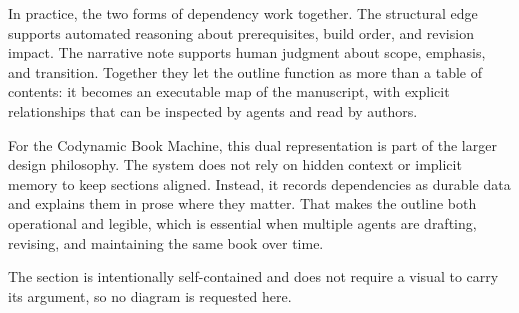 In practice, the two forms of dependency work together. The structural edge supports automated reasoning about prerequisites, build order, and revision impact. The narrative note supports human judgment about scope, emphasis, and transition. Together they let the outline function as more than a table of contents: it becomes an executable map of the manuscript, with explicit relationships that can be inspected by agents and read by authors.

For the Codynamic Book Machine, this dual representation is part of the larger design philosophy. The system does not rely on hidden context or implicit memory to keep sections aligned. Instead, it records dependencies as durable data and explains them in prose where they matter. That makes the outline both operational and legible, which is essential when multiple agents are drafting, revising, and maintaining the same book over time.

The section is intentionally self-contained and does not require a visual to carry its argument, so no diagram is requested here.
